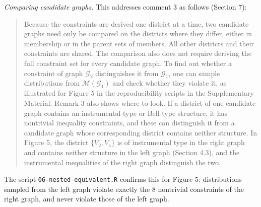 \documentclass{article}
\begin{document}
\begin{enumerate}
\begin{mdframed}
\emph{Comparing candidate graphs.} This addresses comment 3 as follows (Section 7):
\begin{quote}
Because the constraints are derived one district at a time, two candidate graphs need only be compared on the districts where they differ, either in membership or in the parent sets of members. All other districts and their constraints are shared. The comparison also does not require deriving the full constraint set for every candidate graph. To find out whether a constraint of graph $\mathcal{G}_2$ distinguishes it from $\mathcal{G}_1$, one can sample distributions from $\mathcal{M}(\mathcal{G}_1)$ and check whether they violate it, as illustrated for Figure 5 in the reproducibility scripts in the Supplementary Material. Remark 3 also shows where to look. If a district of one candidate graph contains an instrumental-type or Bell-type structure, it has nontrivial inequality constraints, and these can distinguish it from a candidate graph whose corresponding district contains neither structure. In Figure 5, the district $\{V_2, V_4\}$ is of instrumental type in the right graph and contains neither structure in the left graph (Section 4.3), and the instrumental inequalities of the right graph distinguish the two.
\end{quote}
The script \texttt{06-nested-equivalent.R} confirms this for Figure 5: distributions sampled from the left graph violate exactly the 8 nontrivial constraints of the right graph, and never violate those of the left graph.


\end{mdframed}
\end{enumerate}
\end{document}
